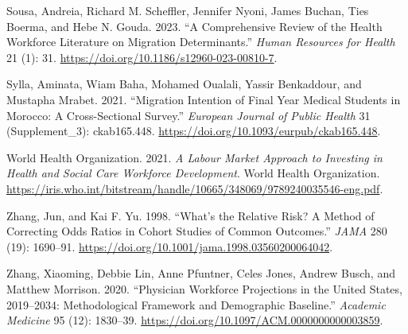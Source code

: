 \documentclass[
  11pt,
  a4paper]{article}
\newlength{\cslhangindent}
\newenvironment{CSLReferences}[2] %
 {\begin{list}{}{%
  \setlength{\itemindent}{0pt}
  \setlength{\leftmargin}{0pt}
  \setlength{\parsep}{0pt}
  \ifodd #1
   \setlength{\leftmargin}{\cslhangindent}
   \setlength{\itemindent}{-1\cslhangindent}
  \fi
  \setlength{\itemsep}{#2\baselineskip}}}
 {\end{list}}
\begin{document}
\begin{CSLReferences}{1}{1}
Sousa, Andreia, Richard M. Scheffler, Jennifer Nyoni, James Buchan, Ties
Boerma, and Hebe N. Gouda. 2023. {``A Comprehensive Review of the Health
Workforce Literature on Migration Determinants.''} \emph{Human Resources
for Health} 21 (1): 31.
\url{https://doi.org/10.1186/s12960-023-00810-7}.

Sylla, Aminata, Wiam Baha, Mohamed Oualali, Yassir Benkaddour, and
Mustapha Mrabet. 2021. {``Migration Intention of Final Year Medical
Students in {Morocco}: A Cross-Sectional Survey.''} \emph{European
Journal of Public Health} 31 (Supplement\_3): ckab165.448.
\url{https://doi.org/10.1093/eurpub/ckab165.448}.

World Health Organization. 2021. \emph{A Labour Market Approach to
Investing in Health and Social Care Workforce Development}. World Health
Organization.
\url{https://iris.who.int/bitstream/handle/10665/348069/9789240035546-eng.pdf}.

Zhang, Jun, and Kai F. Yu. 1998. {``What's the Relative Risk? {A} Method
of Correcting Odds Ratios in Cohort Studies of Common Outcomes.''}
\emph{JAMA} 280 (19): 1690--91.
\url{https://doi.org/10.1001/jama.1998.03560200064042}.

Zhang, Xiaoming, Debbie Lin, Anne Pfuntner, Celes Jones, Andrew Busch,
and Matthew Morrison. 2020. {``Physician Workforce Projections in the
{United States}, 2019--2034: Methodological Framework and Demographic
Baseline.''} \emph{Academic Medicine} 95 (12): 1830--39.
\url{https://doi.org/10.1097/ACM.0000000000003859}.

\end{CSLReferences}
\end{document}
